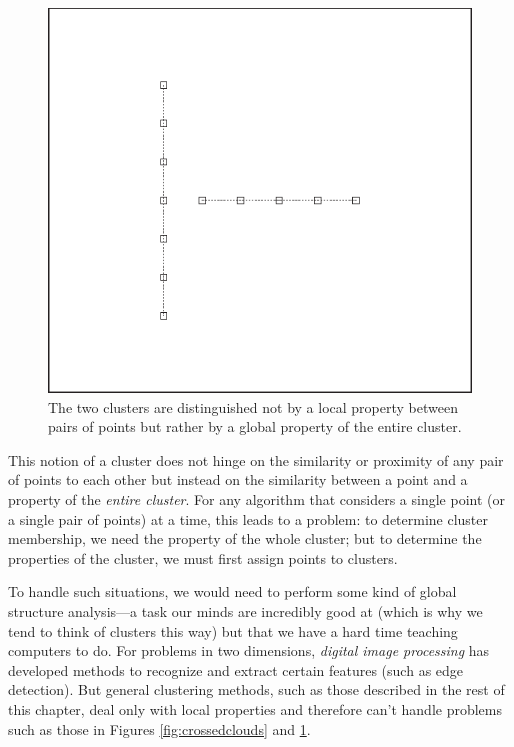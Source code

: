 \begin{figure}
  \centerline{\includegraphics{img/tee}}
  \caption{The two clusters are distinguished not by a local property
    between pairs of points but rather by a global property of the
    entire cluster.}
  \label{fig:tee}
\end{figure}

This notion of a cluster does not hinge on the similarity or proximity
of any pair of points to each other but instead on the similarity
between a point and a property of the \emph{entire cluster}. For any
algorithm that considers a single point (or a single pair of points)
at a time, this leads to a problem: to determine cluster membership,
we need the property of the whole cluster; but to determine the
properties of the cluster, we must first assign points to clusters.

To handle such situations, we would need to perform some kind of
global structure analysis---a task our minds are incredibly good at
(which is why we tend to think of clusters this way) but that we have
a hard time teaching computers to do.  For problems in two dimensions,
\emph{digital image processing} has developed methods to recognize and
extract certain features (such as edge detection). But general
clustering methods, such as those described in the rest of this
chapter, deal only with local properties and therefore can't handle
problems such as those in Figures \ref{fig:crossedclouds} and
\ref{fig:tee}.

